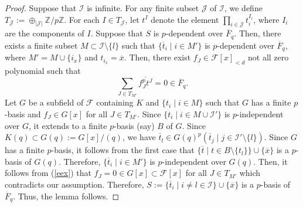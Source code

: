\documentclass[times,10pt]{amsart}
\newcommand{\Z}{\ensuremath{\mathbb{Z}}}
\newcommand{\F}{\ensuremath{\mathcal{F}}}
\newcommand{\I}{\ensuremath{\mathcal{I}}}
\begin{document}
\begin{proof}
 {Suppose that $\I$ is infinite}.   For any finite subset $\mathcal{J}$ of $\I$, we define $ T_{\mathcal{J}}:=\oplus_{|\mathcal{J}|} \Z/p\Z$. For each $I\in T_{\mathcal{J}}$, {let $t^I$ denote} the element $\prod_{i\in {\mathcal{J}}}t_i^{I_i} $, where $I_i$ are the components of $I$. {Suppose that $S$ is} $p$-dependent over $\overline{F}_q$. Then, there exists  a finite subset $M\subset \I\setminus \{l\}$ such that $\{\overline{t}_i\mid i\in M'\}$ is $p$-dependent over $\overline{F}_q$, where $M'=M\cup \{i_x\}$ and  $t_{i_x}=\overline{x}$. Then, there exist $ f_J\in \F[x]_{<d}$  not all zero polynomial such that \begin{equation}\label{eex} \sum_{J\in T_{M'}}\overline{f_J^pt^J}=0\in \overline{F}_q.\end{equation} Let $ G$ be a  subfield of $\F$ containing  $K$ and  $\{t_i\mid i\in M\}$ such that $G$ has a finite $p$-basis and $f_J\in G[x]$ for all $J\in T_{M'}$.  Since $\{t_i\mid i\in M\cup \I'\}$ is $p$-independent over $G$, it  extends to a  finite $p$-basis  (say) $ B$  of $G$.    Since $K(q)\subset G(q):= G[x]/(q)$, we have     $\overline{t}_l\in G(q)^p(\overline{t}_j\mid {j\in \I'\setminus\{l\}})$. Since $G$ has a finite $p$-basis, it follows from  {the first case} that $\{\overline{t}\mid {t\in B\setminus\{t_l\}}\}\cup \{\overline{x}\}$  is a  $p$-basis of $G(q)$. Therefore,  $\{ \overline{t}_i\mid i\in M'\}$ is $p$-independent over $G(q)$. Then, it follows from (\ref{eex}) that ${f}_J=0\in G[x]\subset \F[x]$ for all $J\in T_{M'}$ which  contradicts our assumption. Therefore,  $S:=\{\overline{t}_i\mid i\neq l\in \I\}\cup\{\overline{x}\}$ is a $p$-basis of $\overline{F}_q$. Thus, the lemma follows.
\end{proof}
\end{document}
